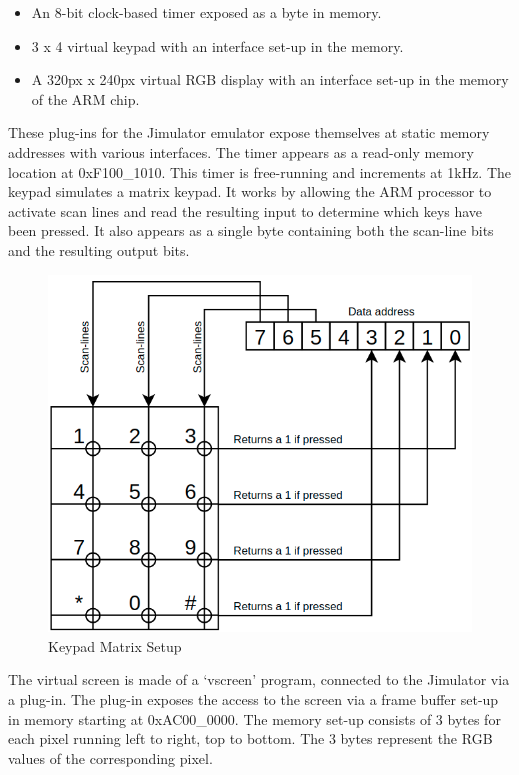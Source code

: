 \begin{itemize}
	\item An 8-bit clock-based timer exposed as a byte in memory.
	\item 3 x 4 virtual keypad with an interface set-up in the memory.
	\item A 320px x 240px virtual RGB display with an interface set-up in the memory of the ARM chip.
\end{itemize}

These plug-ins for the Jimulator emulator expose themselves at static memory addresses with various interfaces.
The timer appears as a read-only memory location at 0xF100\_1010. This timer is free-running and increments at 1kHz. 
The keypad simulates a matrix keypad. It works by allowing the ARM processor to activate scan lines and read the resulting input to determine which keys have been pressed. It also appears as a single byte containing both the scan-line bits and the resulting output bits.

\begin{figure}[ht!]
	\includegraphics[width=0.5\linewidth]{figures/keypad.png}\centering
	\caption{Keypad Matrix Setup}
	\label{fig:keypad}
\end{figure}

The virtual screen is made of a `vscreen' program, connected to the Jimulator via a plug-in. The plug-in exposes the access to the screen via a frame buffer set-up in memory starting at 0xAC00\_0000. The memory set-up consists of 3 bytes for each pixel running left to right, top to bottom. The 3 bytes represent the RGB values of the corresponding pixel.

